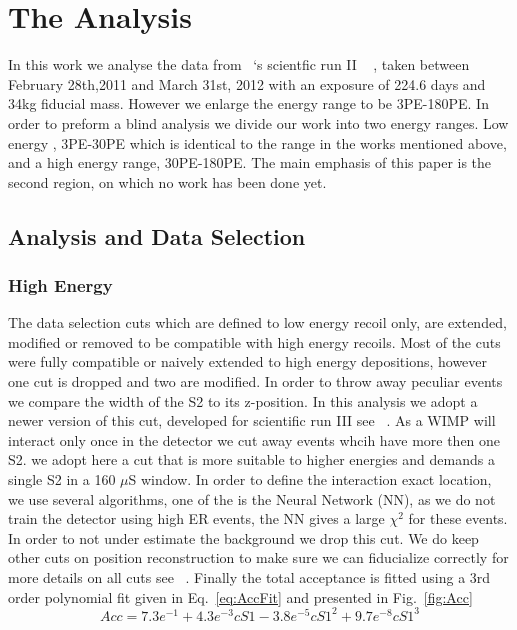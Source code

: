\section{The Analysis}
\label{sec:Analysis}
In this work we analyse the data from \Xehund\ `s scientfic run II ~\cite{xe100_run10_si,xe100_run10_sd} , taken between February 28th,2011 and March 31st, 2012 with an exposure of 224.6 days and 34kg fiducial mass.  However we enlarge the energy range to be 3PE-180PE. In order to preform a blind analysis we divide our work into two energy ranges. Low energy , 3PE-30PE which is identical to the range in the works mentioned above, and a high energy range, 30PE-180PE. The main emphasis of this paper is the second region, on which no work has been done yet.

\subsection{Analysis and Data Selection}
\label{subsec:AnalysisAndDataSelection}
\subsubsection{High Energy}
\label{subsubsec:HighE}

The data selection cuts which are defined to low energy recoil only, are extended, modified or removed to be compatible with high energy recoils. Most of the cuts were fully compatible or naively extended to high energy depositions, however one cut is dropped and two are modified. In order to throw away peculiar events we compare the width of the S2 to its z-position. In this analysis we adopt a newer version of this cut, developed for scientific run III see ~\cite{xe100_run_combination}. As a WIMP will interact only once in the detector we cut away events whcih have more then one S2. we adopt here a cut that is more suitable to higher energies and demands a single S2 in a 160 $\mu$S window. In order to define the interaction exact location, we use several algorithms, one of the is the Neural Network (NN), as we do not train the detector using high ER events, the NN gives a large $\chi^2$ for these events. In order to not under estimate the background we drop this cut. We do keep other cuts on position reconstruction to make sure we can fiducialize correctly for more details on all cuts see ~\cite{xe100_ana2012}. Finally the total acceptance is fitted using a 3rd order polynomial fit given in Eq.~\ref{eq:AccFit} and presented in Fig.~\ref{fig:Acc}
\begin{equation}
\label{eq:AccFit}
	Acc = 7.3e^{-1}+4.3e^{-3}cS1-3.8e^{-5}cS1^2+9.7e^{-8}cS1^3
\end{equation}

